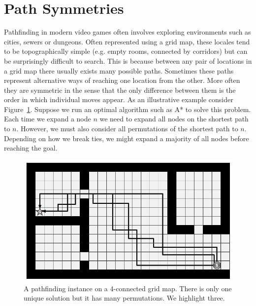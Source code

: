 
\section{Path Symmetries}
Pathfinding in modern video games often involves exploring 
environments such as cities, sewers or dungeons. Often represented using a
grid map, these locales tend to be topographically simple (e.g. empty rooms, 
connected by corridors) but can be surprisingly difficult to search. 
This is because between any pair of locations in a grid map 
there usually exists many possible paths. Sometimes these paths represent 
alternative ways of reaching one location from the other. More often they 
are symmetric in the sense that the only difference between them is the order
in which individual moves appear. 
As an illustrative example consider Figure~\ref{fig::rsr::symmetry}. 
Suppose we run an optimal algorithm such as A* to solve this problem. 
Each time we expand a node $n$ we need to expand all nodes on the shortest path to $n$.
However, we must also consider all permutations of the shortest path to $n$.
Depending on how we break ties, we might expand a majority of all nodes before 
reaching the goal.

\begin{figure}[tb]
\begin{center}
\includegraphics[scale=0.30, trim = 10mm 10mm 10mm 0mm]{chapter_rsr/diagrams/symmetry.png}
\end{center}
\vspace{-3pt}
\caption{A pathfinding instance on a 4-connected grid map. There is only 
one unique solution but it has many permutations. We highlight three.}
\label{fig::rsr::symmetry}
\end{figure}

